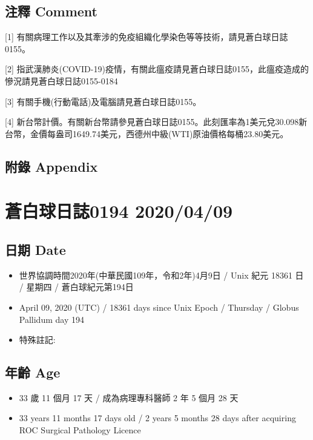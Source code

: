 \documentclass[
]{article}
\providecommand{\tightlist}{%
  \setlength{\itemsep}{0pt}\setlength{\parskip}{0pt}}
\begin{document}
\hypertarget{ux6ce8ux91cb-comment-7}{%
\subsection{注釋 Comment}\label{ux6ce8ux91cb-comment-7}}

{[}1{]}
有關病理工作以及其牽涉的免疫組織化學染色等等技術，請見蒼白球日誌0155。

{[}2{]}
指武漢肺炎(COVID-19)疫情，有關此瘟疫請見蒼白球日誌0155，此瘟疫造成的慘況請見蒼白球日誌0155-0184

{[}3{]} 有關手機(行動電話)及電腦請見蒼白球日誌0155。

{[}4{]}
新台幣計價。有關新台幣請參見蒼白球日誌0155。此刻匯率為1美元兌30.098新台幣，金價每盎司1649.74美元，西德州中級(WTI)原油價格每桶23.80美元。

\hypertarget{ux9644ux9304-appendix-7}{%
\subsection{附錄 Appendix}\label{ux9644ux9304-appendix-7}}

\hypertarget{ux84bcux767dux7403ux65e5ux8a8c0194-20200409}{%
\section{蒼白球日誌0194
2020/04/09}\label{ux84bcux767dux7403ux65e5ux8a8c0194-20200409}}

\hypertarget{ux65e5ux671f-date-8}{%
\subsection{日期 Date}\label{ux65e5ux671f-date-8}}

\begin{itemize}
\tightlist
\item
  世界協調時間2020年(中華民國109年，令和2年)4月9日 / Unix 紀元 18361 日
  / 星期四 / 蒼白球紀元第194日
\item
  April 09, 2020 (UTC) / 18361 days since Unix Epoch / Thursday / Globus
  Pallidum day 194
\item
  特殊註記:
\end{itemize}

\hypertarget{ux5e74ux9f61-age-8}{%
\subsection{年齡 Age}\label{ux5e74ux9f61-age-8}}

\begin{itemize}
\tightlist
\item
  33 歲 11 個月 17 天 / 成為病理專科醫師 2 年 5 個月 28 天
\item
  33 years 11 months 17 days old / 2 years 5 months 28 days after
  acquiring ROC Surgical Pathology Licence
\end{itemize}
\end{document}
